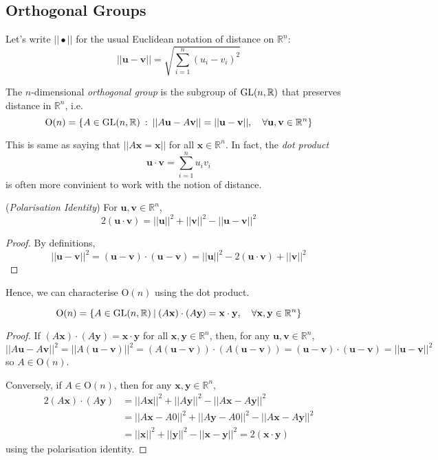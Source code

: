 \documentclass[10pt, a4paper, twoside]{report}
\begin{document}
\subsection{Orthogonal Groups}
Let's write \(||\bullet ||\) for the usual Euclidean notation of distance on \(\mathbb{R}^n\):
\[||\mathbf{u}-\mathbf{v}||=\sqrt{\sum_{i=1}^{n}(u_i-v_i)^2}\]
\begin{definition}
    The \(n\)-dimensional \emph{orthogonal group} is the subgroup of \(\operatorname{GL}(n,\mathbb{R})\) that preserves distance in \(\mathbb{R}^n\), i.e.
    \[\text{O}(n)=\{A\in\operatorname{GL}(n,\mathbb{R})\::\:||A\mathbf{u}-A\mathbf{v}||=||\mathbf{u}-\mathbf{v}||,\quad\forall \mathbf{u,v}\in\mathbb{R}^n\}\]
\end{definition}
\begin{remark}
    This is same as saying that \(||A\mathbf{x}=\mathbf{x}||\) for all \(\mathbf{x}\in\mathbb{R}^n\). In fact, the \emph{dot product}
    \[\mathbf{u}\cdot\mathbf{v}=\sum_{i=1}^nu_iv_i\]
    is often more convinient to work with the notion of distance.
\end{remark}
\begin{lemma}
    (\emph{Polarisation Identity}) For \(\mathbf{u},\mathbf{v}\in\mathbb{R}^n\), 
    \[2(\mathbf{u}\cdot\mathbf{v})=||\mathbf{u}||^2+||\mathbf{v}||^2-||\mathbf{u}-\mathbf{v}||^2\]
\end{lemma}
\begin{proof}
    By definitions,
    \[||\mathbf{u}-\mathbf{v}||^2=(\mathbf{u}-\mathbf{v})\cdot(\mathbf{u}-\mathbf{v})=||\mathbf{u}||^2-2(\mathbf{u}\cdot\mathbf{v})+||\mathbf{v}||^2\]
\end{proof}
Hence, we can characterise \(\mathrm{O}(n)\) using the dot product.
\begin{lemma}
    \[\mathrm{O}(n)=\{A\in\operatorname{GL}(n,\mathbb{R})\:|\:(A\mathbf{x})\cdot(A\mathbf{y})=\mathbf{x}\cdot\mathbf{y},\quad\forall\mathbf{x},\mathbf{y}\in\mathbb{R}^n\}\]
\end{lemma}
\begin{proof}
    If \((A\mathbf{x})\cdot(A\mathbf{y})=\mathbf{x}\cdot\mathbf{y}\) for all \(\mathbf{x},\mathbf{y}\in\mathbb{R}^n\), then, for any \(\mathbf{u},\mathbf{v}\in\mathbb{R}^n\),
    \[||A\mathbf{u}-A\mathbf{v}||^2=||A(\mathbf{u}-\mathbf{v})||^2=(A(\mathbf{u}-\mathbf{v}))\cdot(A(\mathbf{u}-\mathbf{v}))=(\mathbf{u}-\mathbf{v})\cdot(\mathbf{u}-\mathbf{v})=||\mathbf{u}-\mathbf{v}||^2\]
    so \(A\in\mathrm{O}(n)\).

    Conversely, if \(A\in\mathrm{O}(n)\), then for any \(\mathbf{x},\mathbf{y}\in\mathbb{R}^n\),
    \begin{align*}
        2(A\mathbf{x})\cdot(A\mathbf{y})&=||A\mathbf{x}||^2+||A\mathbf{y}||^2-||A\mathbf{x}-A\mathbf{y}||^2 \\
        &=||A\mathbf{x}-A0||^2+||A\mathbf{y}-A0||^2-||A\mathbf{x}-A\mathbf{y}||^2 \\
        &=||\mathbf{x}||^2+||\mathbf{y}||^2-||\mathbf{x}-\mathbf{y}||^2=2(\mathbf{x}\cdot\mathbf{y})
    \end{align*}
    using the polarisation identity.
\end{proof}
\end{document}
